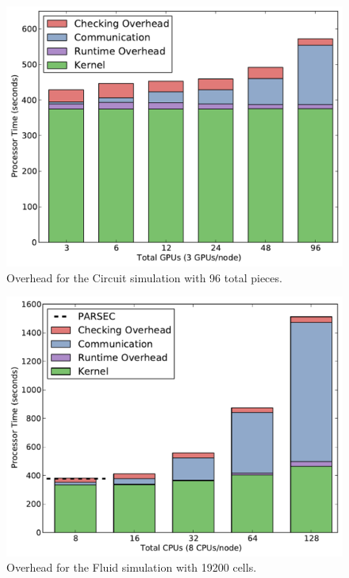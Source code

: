 \begin{figure}
\begin{center}
\includegraphics[scale=0.35]{figs/circuit_96_popl.pdf}
\end{center}
\vspace{-2mm}
\caption{Overhead for the Circuit simulation with 96 total pieces.\label{fig:ckt_overhead}}
\vspace{-6mm}
\end{figure}

\begin{figure}
\begin{center}
\includegraphics[scale=0.35]{figs/fluid_19200_popl.pdf}
\end{center}
\vspace{-2mm}
\caption{Overhead for the Fluid simulation with 19200 cells.\label{fig:fluid_overhead}}
\vspace{-6mm}
\end{figure}

